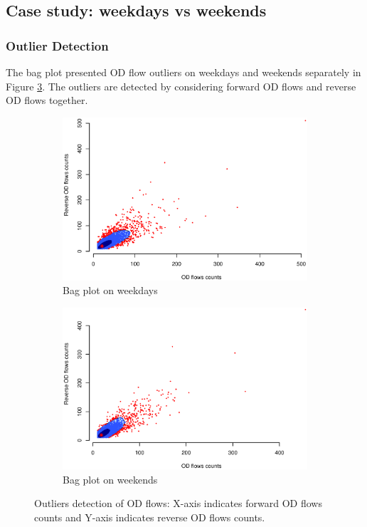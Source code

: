 \documentclass[a4paper,UKenglish]{lipics-v2016}
\begin{document}

\subsection{Case study: weekdays vs weekends}
\subsubsection{Outlier Detection}
The bag plot presented OD flow outliers on weekdays and weekends separately in Figure \ref{fig:week_weekends_bag}. The outliers are detected by considering forward OD flows and reverse OD flows together. 


\begin{figure}
	\centering
	\begin{subfigure}[b]{0.49\textwidth}
		\includegraphics[width=\textwidth]{images/OD_weekdays.eps}
		\caption{Bag plot on weekdays}
		\label{fig:weekdays_bag}
	\end{subfigure}
	\hfill %
	\begin{subfigure}[b]{0.49\textwidth}
		\includegraphics[width=\textwidth]{images/OD_weekends.eps}
		\caption{Bag plot on weekends}
		\label{fig:weekends_bag}
	\end{subfigure}
	\caption{Outliers detection of OD flows: X-axis indicates forward OD flows counts and Y-axis indicates reverse OD flows counts.}\label{fig:week_weekends_bag}	
\end{figure}
\end{document}
